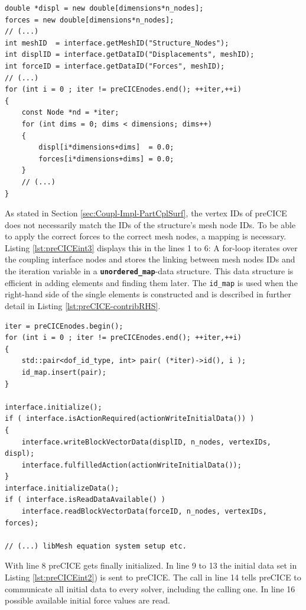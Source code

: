 \begin{lstlisting}[caption=preCICE Integration Part 2,label=lst:preCICEint2,keepspaces=true]
double *displ = new double[dimensions*n_nodes];
forces = new double[dimensions*n_nodes];
// (...)
int meshID  = interface.getMeshID("Structure_Nodes");
int displID = interface.getDataID("Displacements", meshID);
int forceID = interface.getDataID("Forces", meshID);
// (...)
for (int i = 0 ; iter != preCICEnodes.end(); ++iter,++i)
{
	const Node *nd = *iter;
	for (int dims = 0; dims < dimensions; dims++)
	{
		displ[i*dimensions+dims]  = 0.0;
		forces[i*dimensions+dims] = 0.0;
	}
	// (...)
}
\end{lstlisting}
   As stated in Section \ref{sec:Coupl-Impl-PartCplSurf}, the vertex IDs of preCICE does not necessarily match the IDs of the structure's mesh node IDs. To be able to apply the correct forces to the correct mesh nodes, a mapping is necessary. Listing \ref{lst:preCICEint3} displays this in the lines 1 to 6: A for-loop iterates over the coupling interface nodes and stores the linking between mesh nodes IDs and the iteration variable in a \texttt{\textbf{unordered\_map}}-data structure. This data structure is efficient in adding elements and finding them later. The \texttt{id\_map} is used when the right-hand side of the single elements is constructed and is described in further detail in Listing \ref{lst:preCICE-contribRHS}.

\begin{lstlisting}[caption=preCICE Integration Part 3,label=lst:preCICEint3,keepspaces=true]
iter = preCICEnodes.begin();
for (int i = 0 ; iter != preCICEnodes.end(); ++iter,++i)
{
	std::pair<dof_id_type, int> pair( (*iter)->id(), i );
	id_map.insert(pair);
}

interface.initialize();
if ( interface.isActionRequired(actionWriteInitialData()) )
{
	interface.writeBlockVectorData(displID, n_nodes, vertexIDs, displ);
	interface.fulfilledAction(actionWriteInitialData());
}
interface.initializeData();
if ( interface.isReadDataAvailable() )
	interface.readBlockVectorData(forceID, n_nodes, vertexIDs, forces);

// (...) libMesh equation system setup etc.
\end{lstlisting}
   With line 8 preCICE gets finally initialized. In line 9 to 13 the initial data set in Listing \ref{lst:preCICEint2}) is sent to preCICE. The call in line 14 tells preCICE to communicate all initial data to every solver, including the calling one. In line 16 possible available initial force values are read.
   
